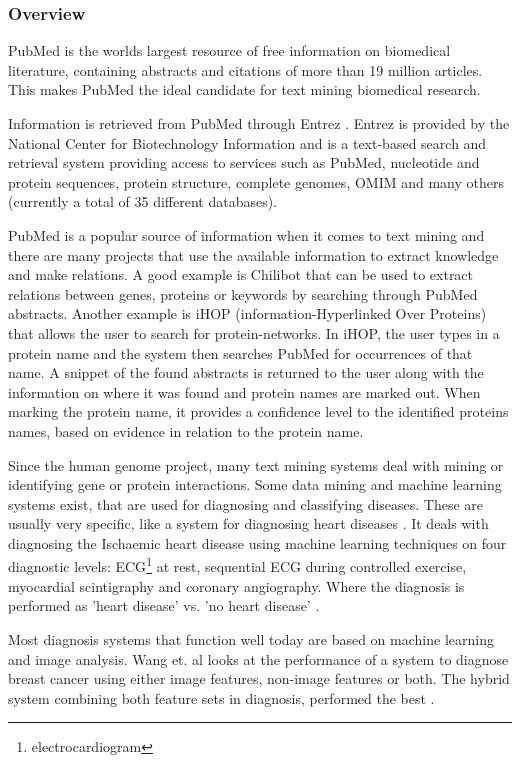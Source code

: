 \subsubsection{Overview}
PubMed \cite{PubMedFactSheet} is the worlds largest resource of free
information on biomedical literature, containing abstracts and
citations of more than 19 million articles. This makes PubMed the
ideal candidate for text mining biomedical research.

Information is retrieved from PubMed through Entrez
\cite{Entrez}. Entrez is provided by the National Center for
Biotechnology Information \cite{NCBIFactSheet} and is a text-based
search and retrieval system providing access to services such as
PubMed, nucleotide and protein sequences, protein structure, complete
genomes, OMIM and many others (currently a total of 35
different databases).

PubMed is a popular source of information when it comes to text mining
and there are many projects that use the available information to
extract knowledge and make relations. A good example is Chilibot
\cite{Chilibot} that can be used to extract relations between genes,
proteins or keywords by searching through PubMed abstracts. Another
example is iHOP \cite{IHOP} (information-Hyperlinked Over Proteins)
that allows the user to search for protein-networks. In iHOP, the user
types in a protein name and the system then searches PubMed for
occurrences of that name. A snippet of the found abstracts is returned
to the user along with the information on where it was found and
protein names are marked out. When marking the protein name, it
provides a confidence level to the identified proteins names, based on
evidence in relation to the protein name.

Since the human genome project, many text mining systems deal with
mining or identifying gene or protein interactions. Some data mining
and machine learning systems exist, that are used for diagnosing and
classifying diseases. These are usually very specific, like a system
for diagnosing heart diseases
\cite{DiagnosingIschaemicHeartDiseaseML}. It deals with diagnosing the
Ischaemic heart disease using machine learning techniques on four
diagnostic levels: ECG\footnote{electrocardiogram} at rest, sequential
ECG during controlled exercise, myocardial scintigraphy and coronary
angiography. Where the diagnosis is performed as 'heart disease'
vs. 'no heart disease' \cite{SVMHeartDiseaseClassification}.

Most diagnosis systems that function well today are based on machine
learning and image analysis. Wang et. al looks at the performance of a
system to diagnose breast cancer using either image features,
non-image features or both. The hybrid system combining both feature
sets in diagnosis, performed the best \cite{Wang1999115}.

